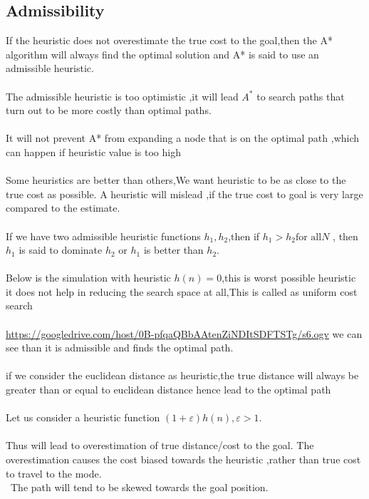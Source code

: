 \documentclass[fontsize=12pt, %
                             paper=a4, %
                             oneside, %
                             captions=tableheading,
                             index=totoc,
                             hyperref]{labbook}
\newcommand{\vurl}[1]{\url{#1}}
\begin{document}
\subsection{Admissibility}
If the heuristic does not overestimate the true cost to the goal,then
the A* algorithm will always find the optimal solution and A* is said to
use an admissible heuristic.
\\\\
The admissible heuristic is too optimistic ,it will lead $A^*$ to
search paths that turn out to be more costly than optimal paths.
\\\\
It will not prevent A* from expanding a node that is on the optimal path ,which can happen
if heuristic value is too high
\\\\
Some heuristics are better than others,We want heuristic to be as close to the true cost as possible.
A heuristic will mislead ,if the true cost to goal is very large compared to the estimate.
\\\\
If we have two admissible heuristic functions $h_1,h_2$,then if $h_1 > h_2 \text{for all} N$ ,
then $h_1$ is said to dominate $h_2$ or $h_1$ is better than $h_2$.
\\\\
Below is the simulation with heuristic $h(n)=0$,this is worst possible heuristic
it does not help in reducing the search space at all,This is called as uniform cost search
\\\\
\vurl{https://googledrive.com/host/0B-pfqaQBbAAtenZiNDItSDFTSTg/s6.ogv}
we can see than it is admissible and finds the optimal path.
\\\\
if we consider the euclidean distance as heuristic,the true distance will
always be greater than or equal to euclidean distance hence lead to the optimal
path
\\\\
Let us consider a heuristic function $(1+\varepsilon) h(n),\varepsilon >1$.
\\\\
Thus will lead to overestimation of true distance/cost to the goal.
The overestimation causes the cost biased towards the heuristic ,rather than
true cost to travel to the mode.
\\\
The path will tend to be skewed towards the goal position.
\\\\
\end{document}
